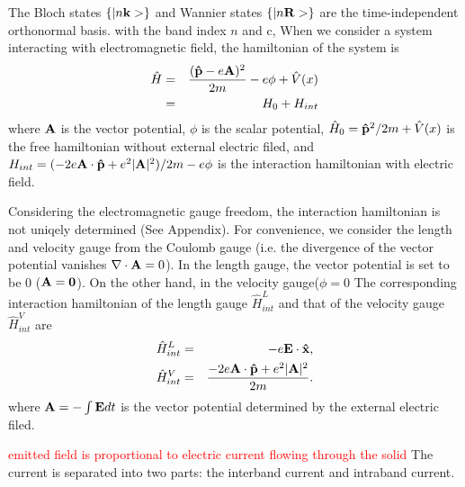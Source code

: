 \documentclass[aps,prb,reprint]{revtex4-1}
\begin{document}
The Bloch states $\{ |n{\bf k}> \}$ and Wannier states $\{ |n{\bf R}> \}$ are the time-independent orthonormal basis.
with the band index $n$ and c,
When we consider a system interacting with electromagnetic field, the hamiltonian of the system is \begin{eqnarray*}
 \hat{H} &=&\frac{ ({\bf \hat{p}} - e{\bf A})^2 }{2m} -e \phi + \hat{V}(x)\\ 
 &=& H_0 + H_{int}\\
 \end{eqnarray*}
where ${\bf A}$ is the vector potential, $\phi$ is the scalar potential, $\hat{H}_0 = {\bf \hat{p}}^2/2m + \hat{V}(x)$ is the free hamiltonian without external electric filed, and $H_{int} =( - 2e{\bf A} \cdot {\bf \hat{p}} + e^2 |{\bf A}|^2)/2m -e \phi$ is the interaction hamiltonian with electric field.

Considering the electromagnetic gauge freedom, the interaction hamiltonian is not uniqely determined (See Appendix). For convenience, we consider the length and velocity gauge from the Coulomb gauge (i.e. the divergence of the vector potential vanishes $\nabla \cdot {\bf A} = 0$). In the length gauge, the vector potential is set to be 0 (${\bf A} = {\bf 0}$). On the other hand, in the velocity gauge($\phi = 0$
The corresponding interaction hamiltonian of the length gauge  $\hat{H}^{L}_{int}$ and that of the velocity gauge $\hat{H}^{V}_{int}$ are 
 \begin{eqnarray*}
 \hat{H}^{L}_{int} &=&  -e{\bf E} \cdot {\bf \hat{x}}, \\
 \hat{H}^{V}_{int} &=& \frac{- 2e{\bf A} \cdot {\bf \hat{p}} + e^2 |{\bf A}|^2}{2m}. \\
\end{eqnarray*}
where ${\bf A} = - \int {\bf E} dt$ is the vector potential determined by the external electric filed. 

\textcolor{red}{emitted field is proportional to electric current flowing through the solid}
The current is separated into two parts: the interband current and intraband current.\cite{Foldi}

\end{document}
